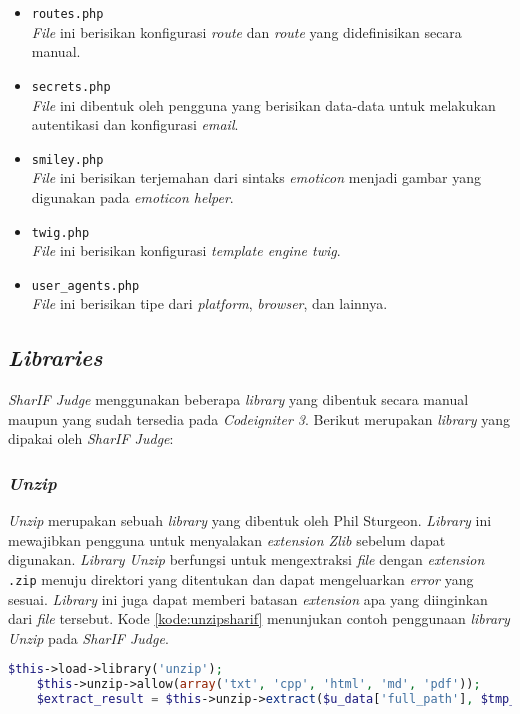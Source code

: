 \begin{itemize}
	\item \texttt{routes.php} \\ \textit{File} ini berisikan konfigurasi \textit{route} dan \textit{route} yang didefinisikan secara manual.
	\item \texttt{secrets.php} \\ \textit{File} ini dibentuk oleh pengguna yang berisikan data-data untuk melakukan autentikasi dan konfigurasi \textit{email}.
	\item \texttt{smiley.php} \\ \textit{File} ini berisikan terjemahan dari sintaks \textit{emoticon} menjadi gambar yang digunakan pada \textit{emoticon helper}.
	\item \texttt{twig.php} \\ \textit{File} ini berisikan konfigurasi \textit{template engine twig}.
	\item \texttt{user\_agents.php} \\ \textit{File} ini berisikan tipe dari \textit{platform}, \textit{browser}, dan lainnya.
\end{itemize}

\subsection{\textit{Libraries}}
\textit{SharIF Judge} menggunakan beberapa \textit{library} yang dibentuk secara manual maupun yang sudah tersedia pada \textit{Codeigniter 3}. Berikut merupakan \textit{library} yang dipakai oleh \textit{SharIF Judge}:

\subsubsection{\textit{Unzip}}
\textit{Unzip} merupakan sebuah \textit{library} yang dibentuk oleh Phil Sturgeon. \textit{Library} ini mewajibkan pengguna untuk menyalakan \textit{extension Zlib} sebelum dapat digunakan. \textit{Library Unzip} berfungsi untuk mengextraksi \textit{file} dengan \textit{extension} \texttt{.zip} menuju direktori yang ditentukan dan dapat mengeluarkan \textit{error} yang sesuai. \textit{Library} ini juga dapat memberi batasan \textit{extension} apa yang diinginkan dari \textit{file} tersebut. Kode \ref{kode:unzipsharif} menunjukan contoh penggunaan \textit{library Unzip} pada \textit{SharIF Judge}.

\begin{lstlisting}[language=PHP, caption=Contoh kode penggunaan \textit{Library Unzip}, label=kode:unzipsharif]
	$this->load->library('unzip');
	$this->unzip->allow(array('txt', 'cpp', 'html', 'md', 'pdf'));
	$extract_result = $this->unzip->extract($u_data['full_path'], $tmp_dir);
\end{lstlisting}

